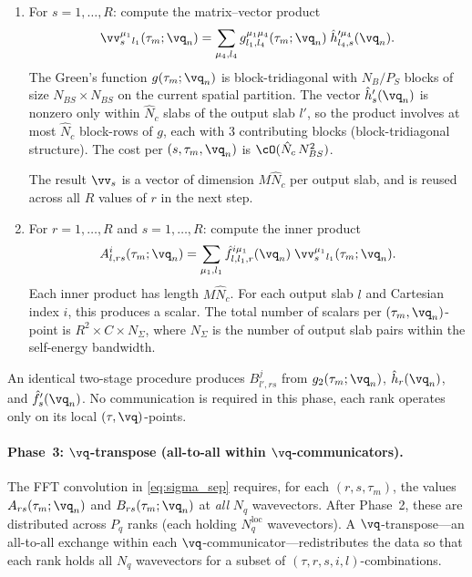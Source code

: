 \begin{enumerate}
\item For $s = 1,\ldots,R$: compute the matrix--vector product
  \begin{equation}
    \vv_s^{\mu_1}{}_{l_1}(\tau_m;\vq_n)
    = \sum_{\mu_4,l_4}
      g^{\mu_1\mu_4}_{l_1,l_4}(\tau_m;\vq_n)\;
      \hat{h}'^{\mu_4}_{l_4,s}(\vq_n).
    \label{eq:matvec}
  \end{equation}
  The Green's function $g(\tau_m;\vq_n)$ is block-tridiagonal
  with $N_B/P_S$ blocks of size $N_{BS}\times N_{BS}$ on the
  current spatial partition.  The vector
  $\hat{h}'_s(\vq_n)$ is nonzero only within $\hat{N}_c$ slabs
  of the output slab $l'$, so the product involves at most
  $\hat{N}_c$ block-rows of $g$, each with 3 contributing
  blocks (block-tridiagonal structure).  The cost per
  $(s,\tau_m,\vq_n)$ is $\cO(\hat{N}_c\,N_{BS}^2)$.

  The result $\vv_s$ is a vector of dimension $M\hat{N}_c$ per
  output slab, and is reused across all $R$ values of $r$ in
  the next step.

\item For $r = 1,\ldots,R$ and $s = 1,\ldots,R$: compute the
  inner product
  \begin{equation}
    A^{i}_{l,rs}(\tau_m;\vq_n)
    = \sum_{\mu_1,l_1}
      \hat{f}^{i\mu_1}_{l,l_1,r}(\vq_n)\;
      \vv_s^{\mu_1}{}_{l_1}(\tau_m;\vq_n).
    \label{eq:innerprod}
  \end{equation}
  Each inner product has length $M\hat{N}_c$.  For each
  output slab $l$ and Cartesian index $i$, this produces a
  scalar.  The total number of scalars per
  $(\tau_m,\vq_n)$-point is $R^2 \times C \times N_\Sigma$,
  where $N_\Sigma$ is the number of output slab pairs within
  the self-energy bandwidth.
\end{enumerate}

An identical two-stage procedure produces $B^{j}_{l',rs}$
from $g_2(\tau_m;\vq_n)$, $\hat{h}_r(\vq_n)$, and
$\hat{f}'_s(\vq_n)$. No communication is required in this phase, each rank
operates only on its local $(\tau,\vq)$-points.

\paragraph{Phase~3: $\vq$-transpose
  (all-to-all within $\vq$-communicators).}
%
The FFT convolution in \cref{eq:sigma_sep} requires, for each
$(r,s,\tau_m)$, the values $A_{rs}(\tau_m;\vq_n)$ and
$B_{rs}(\tau_m;\vq_n)$ at \emph{all} $N_q$ wavevectors.
After Phase~2, these are distributed across $P_q$ ranks (each
holding $N_q^{\mathrm{loc}}$ wavevectors).  A
$\vq$-transpose---an all-to-all exchange within each
$\vq$-communicator---redistributes the data so that each rank
holds all $N_q$ wavevectors for a subset of
$(\tau,r,s,i,l)$-combinations.

